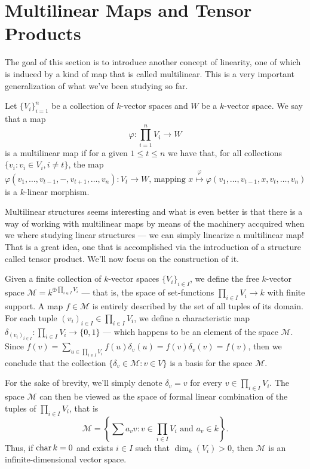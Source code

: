 
\section{Multilinear Maps and Tensor Products}

The goal of this section is to introduce another concept of linearity, one of
which is induced by a kind of map that is called multilinear. This is a very
important generalization of what we've been studying so far.

\begin{definition}\label{def: multilinear map}
  Let \(\{V_i\}_{i=1}^n\) be a collection of \(k\)-vector spaces and \(W\) be a
  \(k\)-vector space. We say that a map
  \[
    \varphi: \prod_{i=1}^n V_i \to W
  \]
  is a multilinear map if for a given \(1 \leq t \leq n\) we have that, for all
  collections \(\{v_i : v_i \in V_i, i \neq t\}\), the map
  \[
    \varphi(v_1, \dots, v_{t-1}, -, v_{t+1}, \dots, v_n): V_t \longrightarrow W
    \text{, mapping } x \overset{\varphi}\longmapsto \varphi(v_1, \dots, v_{t-1}, x, v_t, \dots, v_n)
  \]
  is a \(k\)-linear morphism.
\end{definition}

Multilinear structures seems interesting and what is even better is that there
is a way of working with multilinear maps by means of the machinery accquired
when we where studying linear structures --- we can simply linearize a multilinear
map! That is a great idea, one that is accomplished via the introduction of a
structure called tensor product. We'll now focus on the construction of it.

Given a finite collection of \(k\)-vector spaces \(\{V_i\}_{i \in I}\), we define
the free \(k\)-vector space \(\mathcal M = k^{\oplus \prod_{i \in I} V_i}\) --- that is, the
space of set-functions \(\prod_{i \in I} V_i \to k\) with finite support. A map \(f \in
\mathcal M\) is entirely described by the set of all tuples of its domain. For
each tuple \((v_i)_{i \in I} \in \prod_{i \in I} V_i\), we define a characteristic map
\(\delta_{(v_{i})_{i \in I}}: \prod_{i \in I} V_i \to \{0, 1\}\) --- which happens to be an
element of the space \(\mathcal M\). Since \(f(v) = \sum_{u \in \prod_{i \in I}V_i} f(u)
\delta_v(u) = f(v) \delta_v(v) = f(v)\), then we conclude that the collection \(\{\delta_{v} \in
\mathcal M : v \in V\}\) is a basis for the space \(\mathcal M\).

For the sake of brevity, we'll simply denote \(\delta_v = v\) for every \(v \in \prod_{i \in
I} V_i\). The space \(\mathcal M\) can then be viewed as the space of formal
linear combination of the tuples of \(\prod_{i \in I} V_i\), that is
\[
  \mathcal M =
  \left\{
    \sum a_v v : v \in \prod_{i \in I} V_i \text{ and } a_v \in k
  \right\}.
\]
Thus, if \(\operatorname{char} k = 0\) and exists \(i \in I\) such that \(\dim_k(V_i) >
0\), then \(\mathcal M\) is an infinite-dimensional vector space.

